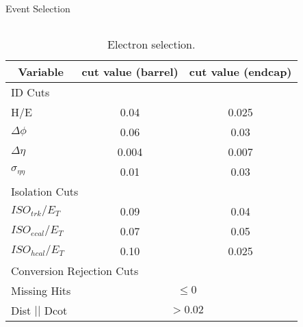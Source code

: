 \documentclass[8pt]{beamer}
\begin{document}
\begin{frame}{Event Selection}
\begin{columns}[c]
\tiny{
    \begin{center}
    \begin{table}[htbp]
    \begin{tabular}{|lcc|} \hline
      \multicolumn{1}{|c}{Variable} & \multicolumn{1}{c}{cut value (barrel)}& \multicolumn{1}{c|}{cut value (endcap)}\\
        \hline   \hline
       \multicolumn{3}{|l|}{ID Cuts}\\ \hline
        H/E & 0.04 & 0.025 \\
        $\Delta\phi$ & 0.06 & 0.03 \\
        $\Delta\eta$ & 0.004 & 0.007  \\
        $\sigma_{\eta\eta}$ & 0.01 & 0.03 \\ \hline
      \multicolumn{3}{|l|}{Isolation Cuts}\\ \hline
       $ISO_{trk} / E_T $  & 0.09 & 0.04 \\
       $ISO_{ecal}/ E_T$  & 0.07 & 0.05 \\
       $ISO_{hcal}/ E_T$  & 0.10 & 0.025 \\ \hline
      \multicolumn{3}{|l|}{Conversion Rejection Cuts}\\ \hline
       Missing Hits  & \multicolumn{2}{c|}{$\leq 0$}\\
       Dist $||$ Dcot   & \multicolumn{2}{c|}{$>0.02$}\\
      \hline
    \end{tabular}
    \caption{\label{tab:elecuts} Electron selection.}%
    \end{table}
    \end{center}
}
  \end{columns}
\end{frame}
\end{document}
